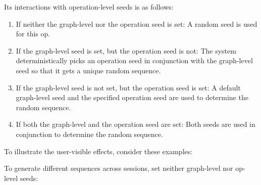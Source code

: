 Its interactions with operation-level seeds is as follows:

\begin{enumerate}
\def\labelenumi{\arabic{enumi}.}
\tightlist
\item
  If neither the graph-level nor the operation seed is set: A random
  seed is used for this op.
\item
  If the graph-level seed is set, but the operation seed is not: The
  system deterministically picks an operation seed in conjunction with
  the graph-level seed so that it gets a unique random sequence.
\item
  If the graph-level seed is not set, but the operation seed is set: A
  default graph-level seed and the specified operation seed are used to
  determine the random sequence.
\item
  If both the graph-level and the operation seed are set: Both seeds are
  used in conjunction to determine the random sequence.
\end{enumerate}

To illustrate the user-visible effects, consider these examples:

To generate different sequences across sessions, set neither graph-level
nor op-level seeds:

\begin{Shaded}
\begin{Highlighting}[]
\OperatorTok{=} \NormalTok{tf.random_uniform([}\NormalTok{])}
\OperatorTok{=} \NormalTok{tf.random_normal([}\NormalTok{])}

 
  
   
   
   
   

 
  
   
   
   
   
\end{Highlighting}
\end{Shaded}

